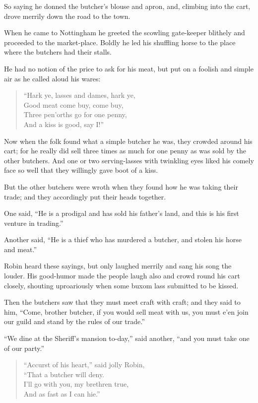 So saying he donned the butcher's blouse and apron, and, climbing into
the cart, drove merrily down the road to the town.

When he came to Nottingham he greeted the scowling gate-keeper blithely
and proceeded to the market-place. Boldly he led his shuffling horse to
the place where the butchers had their stalls.

He had no notion of the price to ask for his meat, but put on a foolish
and simple air as he called aloud his wares:

\begin{quote}
“Hark ye, lasses and dames, hark ye,\\
Good meat come buy, come buy,\\
Three pen’orths go for one penny,\\
And a kiss is good, say I!”
\end{quote}

Now when the folk found what a simple butcher he was, they crowded
around his cart; for he really did sell three times as much for one
penny as was sold by the other butchers. And one or two serving-lasses
with twinkling eyes liked his comely face so well that they willingly
gave boot of a kiss.

But the other butchers were wroth when they found how he was taking
their trade; and they accordingly put their heads together.

One said, ``He is a prodigal and has sold his father's land, and this is
his first venture in trading.''

Another said, ``He is a thief who has murdered a butcher, and stolen his
horse and meat.''

Robin heard these sayings, but only laughed merrily and sang his song
the louder. His good-humor made the people laugh also and crowd round
his cart closely, shouting uproariously when some buxom lass submitted
to be kissed.

Then the butchers saw that they must meet craft with craft; and they
said to him, ``Come, brother butcher, if you would sell meat with us,
you must e'en join our guild and stand by the rules of our trade.''

``We dine at the Sheriff's mansion to-day,'' said another, ``and you
must take one of our party.''

\begin{quote}
“Accurst of his heart,” said jolly Robin,\\
“That a butcher will deny.\\
I’ll go with you, my brethren true,\\
And as fast as I can hie.”
\end{quote}

